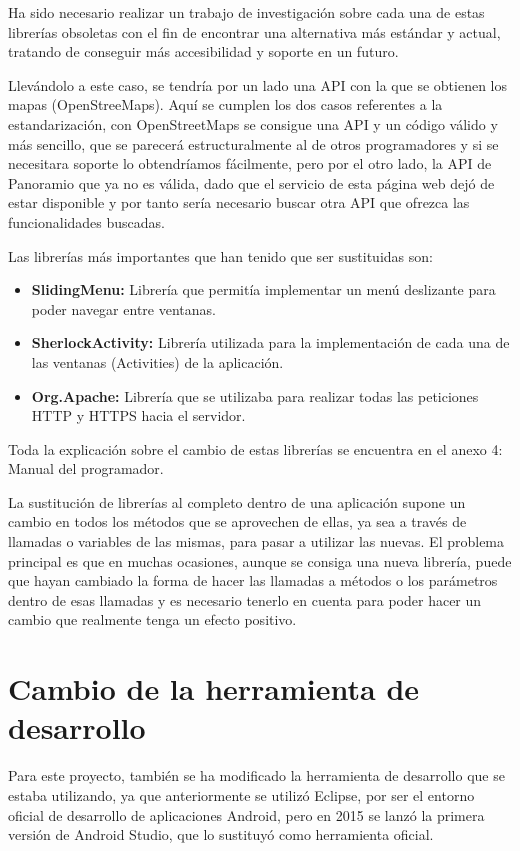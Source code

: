 Ha sido necesario realizar un trabajo de investigación sobre cada una de estas librerías obsoletas con el fin de encontrar una alternativa más estándar y actual, tratando de conseguir más accesibilidad y soporte en un futuro.

Llevándolo a este caso, se tendría por un lado una API con la que se obtienen los mapas (OpenStreeMaps). Aquí se cumplen los dos casos referentes a la estandarización, con OpenStreetMaps se consigue una API y un código válido y más sencillo, que se parecerá estructuralmente al de otros programadores y si se necesitara soporte lo obtendríamos fácilmente, pero por el otro lado, la API de Panoramio que ya no es válida, dado que el servicio de esta página web dejó de estar disponible y por tanto sería necesario buscar otra API que ofrezca las funcionalidades buscadas.

Las librerías más importantes que han tenido que ser sustituidas son:

\begin{itemize}
\item \textbf{SlidingMenu:} Librería que permitía implementar un menú deslizante para poder navegar entre ventanas.
\item \textbf{SherlockActivity:} Librería utilizada para la implementación de cada una de las ventanas (Activities) de la aplicación.
\item \textbf{Org.Apache:} Librería que se utilizaba para realizar todas las peticiones HTTP y HTTPS hacia el servidor.
\end{itemize}

Toda la explicación sobre el cambio de estas librerías se encuentra en el anexo 4: Manual del programador.

La sustitución de librerías al completo dentro de una aplicación supone un cambio en todos los métodos que se aprovechen de ellas, ya sea a través de llamadas o variables de las mismas, para pasar a utilizar las nuevas. El problema principal es que en muchas ocasiones, aunque se consiga una nueva librería, puede que hayan cambiado la forma de hacer las llamadas a métodos o los parámetros dentro de esas llamadas y es necesario tenerlo en cuenta para poder hacer un cambio que realmente tenga un efecto positivo.

\section{Cambio de la herramienta de desarrollo}

Para este proyecto, también se ha modificado la herramienta de desarrollo que se estaba utilizando, ya que anteriormente se utilizó Eclipse, por ser el entorno oficial de desarrollo de aplicaciones Android, pero en 2015 se lanzó la primera versión de Android Studio, que lo sustituyó como herramienta oficial.

